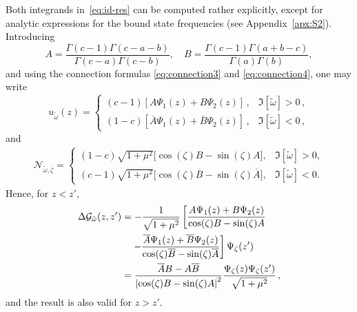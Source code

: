 \documentclass[aps, prd, amsmath, floats, floatfix, twocolumn, nofootinbib, superscriptaddress, showpacs]{revtex4-1}
\begin{document}
Both integrands in~\eqref{eq:id-res}
can be computed rather explicitly, except for analytic expressions for the
bound state frequencies (see Appendix~\ref{apx:S2}). 
%
Introducing
%
\begin{equation*}
A=\frac{\Gamma(c-1)\Gamma(c-a-b)}{\Gamma(c-a)\Gamma(c-b)} , \quad B=\frac{\Gamma(c-1)\Gamma(a+b-c)}{\Gamma(a)\Gamma(b)} ,
\end{equation*}
%
and using the connection formulas \eqref{eq:connection3} and \eqref{eq:connection4}, one may write
%
\begin{equation*}
u_{\tilde{\omega}}(z) = \begin{cases}
(c-1) \left[A \Psi_1(z) + B \Psi_2(z) \right] \, , & \Im[\tilde{\omega}] > 0 \, , \\
(1-c) \left[\overline{A} \Psi_1(z) + \overline{B} \Psi_2(z) \right] \, , & \Im[\tilde{\omega}] < 0 \, ,
\end{cases}
\end{equation*}
%
and
%
\begin{align*}
\mathcal{N}_{\tilde{\omega},\zeta}
= \begin{cases} 
(1-c) \sqrt{1+\mu^2} \big[{\cos(\zeta)} B - \sin(\zeta) A \big], & \Im[\tilde{\omega}] > 0 , \\
(c-1) \sqrt{1+\mu^2} \big[{\cos(\zeta)} \overline{B} - \sin(\zeta) \overline{A} \big], & \Im[\tilde{\omega}] < 0 .
\end{cases}
\end{align*}
%
Hence, for $z < z'$, 
%
\begin{align}
\Delta \mathcal{G}_{\tilde{\omega}}(z,z')
&= - \frac{1}{\sqrt{1+\mu^2}} \left[ \frac{A \Psi_1(z) + B \Psi_2(z)}{\cos(\zeta) B - \sin(\zeta) A} \right. \notag \\
&\quad \left. - \frac{\overline{A} \Psi_1(z) + \overline{B} \Psi_2(z)}{\cos(\zeta) \overline{B} - \sin(\zeta) \overline{A}} \right] \Psi_{\zeta}(z') \notag
\\
&= \frac{\overline{A}B-A\overline{B}}{\left|{\cos(\zeta) B-\sin(\zeta) A}\right|^2} \frac{\Psi_{\zeta}(z)\Psi_{\zeta}(z')}{\sqrt{1+\mu^2}} \, ,
\end{align}
%
and the result is also valid for $z > z'$.
\end{document}
